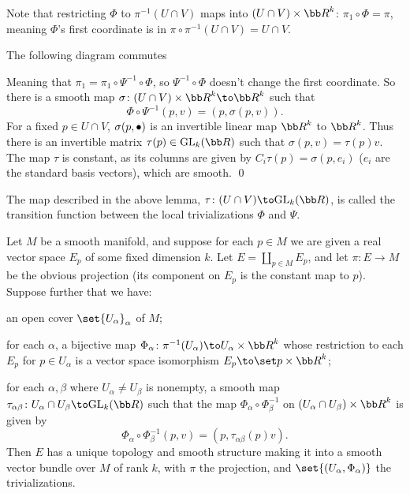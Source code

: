 \elemm

\bproof

    Note that restricting $\Phi$ to $\pi^{-1}(U\cap V)$ maps into $(U\cap V)\times\bR^k$: $\pi_1\circ\Phi=\pi$, meaning $\Phi$'s first coordinate is in
    $\pi\circ\pi^{-1}(U\cap V)=U\cap V$.

    The following diagram commutes

    \bigskip
    \centerline{}

    Meaning that $\pi_1=\pi_1\circ\Psi^{-1}\circ\Phi$, so $\Psi^{-1}\circ\Phi$ doesn't change the first coordinate.
    So there is a smooth map $\sigma\colon(U\cap V)\times\bR^k\to\bR^k$ such that
    $$ \Phi\circ\Psi^{-1}(p,v) = (p,\sigma(p,v)) . $$
    For a fixed $p\in U\cap V$, $\sigma(p,\bullet)$ is an invertible linear map $\bR^k$ to $\bR^k$.
    Thus there is an invertible matrix $\tau(p)\in\gl_k(\bR)$ such that $\sigma(p,v)=\tau(p)v$.
    The map $\tau$ is constant, as its columns are given by $C_i\tau(p)=\sigma(p,e_i)$ ($e_i$ are the standard basis vectors), which are smooth.
    \qed

\eproof

\bdefn

    The map described in the above lemma, $\tau\colon(U\cap V)\to\gl_k(\bR)$, is called the {\emphcolor transition function} between the local trivializations
    $\Phi$ and $\Psi$.

\edefn

\blemm

    Let $M$ be a smooth manifold, and suppose for each $p\in M$ we are given a real vector space $E_p$ of some fixed dimension $k$.
    Let $E=\coprod_{p\in M}E_p$, and let $\pi\colon E\to M$ be the obvious projection (its component on $E_p$ is the constant map to $p$).
    Suppose further that we have:
    \benum
        \item an open cover $\set{U_\alpha}_\alpha$ of $M$;
        \item for each $\alpha$, a bijective map $\Phi_\alpha\colon\pi^{-1}(U_\alpha)\to U_\alpha\times\bR^k$ whose restriction to each $E_p$ for $p\in U_\alpha$
        is a vector space isomorphism $E_p\to\set p\times\bR^k$;
        \item for each $\alpha,\beta$ where $U_\alpha\neq U_\beta$ is nonempty, a smooth map $\tau_{\alpha\beta}\colon U_\alpha\cap U_\beta\to\gl_k(\bR)$ such that the map
        $\Phi_\alpha\circ\Phi_\beta^{-1}$ on $(U_\alpha\cap U_\beta)\times\bR^k$ is given by
        $$ \Phi_\alpha\circ\Phi_\beta^{-1}(p,v) = (p,\tau_{\alpha\beta}(p)v) . $$
    \eenum
    Then $E$ has a unique topology and smooth structure making it into a smooth vector bundle over $M$ of rank $k$, with $\pi$ the projection, and $\set{(U_\alpha,\Phi_\alpha)}$
    the trivializations.

